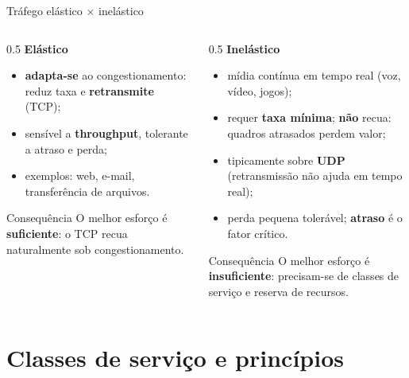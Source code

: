 \documentclass[aspectratio=169,11pt]{beamer}
\begin{document}
\begin{frame}{Tráfego elástico $\times$ inelástico}
  \begin{columns}
    \begin{column}{0.5\textwidth}
      \textbf{Elástico}
      \begin{itemize}
        \item \textbf{adapta-se} ao congestionamento: reduz taxa e \textbf{retransmite} (TCP);
        \item sensível a \textbf{throughput}, tolerante a atraso e perda;
        \item exemplos: web, e-mail, transferência de arquivos.
      \end{itemize}
      \begin{exampleblock}{Consequência}
        O melhor esforço é \textbf{suficiente}: o TCP recua naturalmente sob congestionamento.
      \end{exampleblock}
    \end{column}
    \begin{column}{0.5\textwidth}
      \textbf{Inelástico}
      \begin{itemize}
        \item mídia contínua em tempo real (voz, vídeo, jogos);
        \item requer \textbf{taxa mínima}; \textbf{não} recua: quadros atrasados perdem valor;
        \item tipicamente sobre \textbf{UDP} (retransmissão não ajuda em tempo real);
        \item perda pequena tolerável; \textbf{atraso} é o fator crítico.
      \end{itemize}
      \begin{alertblock}{Consequência}
        O melhor esforço é \textbf{insuficiente}: precisam-se de classes de serviço e reserva de recursos.
      \end{alertblock}
    \end{column}
  \end{columns}
\end{frame}

\section{Classes de serviço e princípios}
\end{document}
